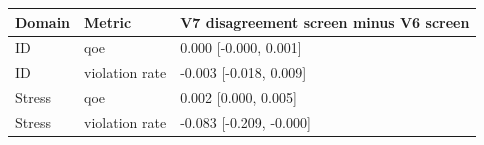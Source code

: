 \begin{tabular}{lll}
\toprule
Domain & Metric & V7 disagreement screen minus V6 screen \\
\midrule
ID & qoe & 0.000 [-0.000, 0.001] \\
ID & violation rate & -0.003 [-0.018, 0.009] \\
Stress & qoe & 0.002 [0.000, 0.005] \\
Stress & violation rate & -0.083 [-0.209, -0.000] \\
\bottomrule
\end{tabular}
